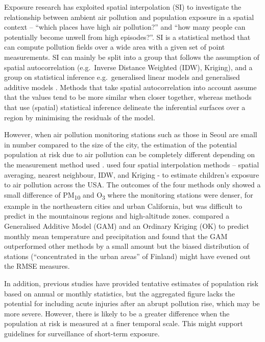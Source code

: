 Exposure research has exploited spatial interpolation (SI) to
investigate the relationship between ambient air pollution and
population exposure in a spatial context -- ``which places have high air
pollution?'' and ``how many people can potentially become unwell from
high episodes?''. SI is a statistical method that can compute pollution
fields over a wide area with a given set of point measurements. SI can
mainly be split into a group that follows the assumption of spatial
autocorrelation (e.g.~Inverse Distance Weighted (IDW), Kriging), and a
group on statistical inference e.g.~generalised linear models and
generalised additive models \citep{Wood2019}. Methods that take spatial
autocorrelation into account assume that the values tend to be more
similar when closer together, whereas methods that use (spatial)
statistical inference delineate the inferential surfaces over a region
by minimising the residuals of the model.

However, when air pollution monitoring stations such as those in Seoul
are small in number compared to the size of the city, the estimation of
the potential population at risk due to air pollution can be completely
different depending on the measurement method used \citep{Wu2019}.
\citet{Wong2004} used four spatial interpolation methods -- spatial
averaging, nearest neighbour, IDW, and Kriging - to estimate children's
exposure to air pollution across the USA. The outcomes of the four
methods only showed a small difference of PM\textsubscript{10} and
O\textsubscript{3} where the monitoring stations were denser, for
example in the northeastern cities and urban California, but was
difficult to predict in the mountainous regions and high-altitude zones.
\citet{Aalto2013} compared a Generalised Additive Model (GAM) and an
Ordinary Kriging (OK) to predict monthly mean temperature and
precipitation and found that the GAM outperformed other methods by a
small amount but the biased distribution of stations (``concentrated in
the urban areas'' of Finland) might have evened out the RMSE measures.

In addition, previous studies have provided tentative estimates of
population risk based on annual or monthly statistics, but the
aggregated figure lacks the potential for including acute injuries after
an abrupt pollution rise, which may be more severe. However, there is
likely to be a greater difference when the population at risk is
measured at a finer temporal scale. This might support guidelines for
surveillance of short-term exposure.

